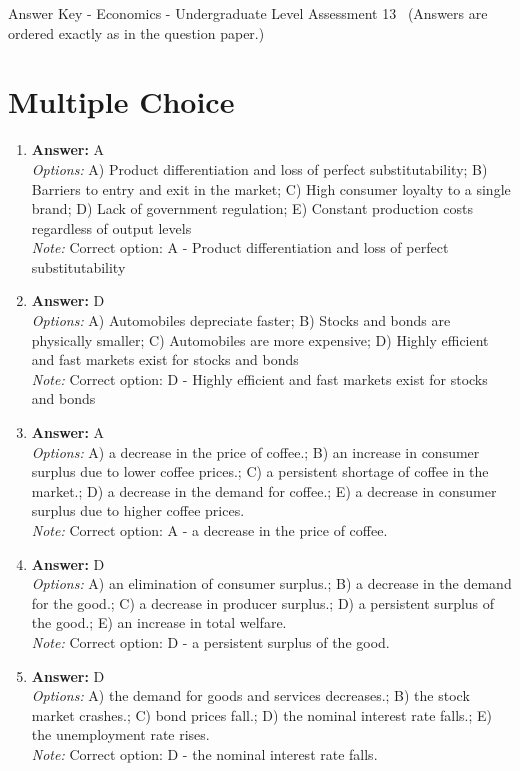 \documentclass[12pt]{article}
\begin{document}
\begin{center}
Answer Key - Economics - Undergraduate Level Assessment 13 \
\small (Answers are ordered exactly as in the question paper.)
\end{center}

\section*{Multiple Choice}
\begin{enumerate}[label=\arabic*.]
\item \textbf{Answer:} A
\\ \textit{Options:} A) Product differentiation and loss of perfect substitutability; B) Barriers to entry and exit in the market; C) High consumer loyalty to a single brand; D) Lack of government regulation; E) Constant production costs regardless of output levels
\\ \textit{Note:} Correct option: A - Product differentiation and loss of perfect substitutability
\item \textbf{Answer:} D
\\ \textit{Options:} A) Automobiles depreciate faster; B) Stocks and bonds are physically smaller; C) Automobiles are more expensive; D) Highly efficient and fast markets exist for stocks and bonds
\\ \textit{Note:} Correct option: D - Highly efficient and fast markets exist for stocks and bonds
\item \textbf{Answer:} A
\\ \textit{Options:} A) a decrease in the price of coffee.; B) an increase in consumer surplus due to lower coffee prices.; C) a persistent shortage of coffee in the market.; D) a decrease in the demand for coffee.; E) a decrease in consumer surplus due to higher coffee prices.
\\ \textit{Note:} Correct option: A - a decrease in the price of coffee.
\item \textbf{Answer:} D
\\ \textit{Options:} A) an elimination of consumer surplus.; B) a decrease in the demand for the good.; C) a decrease in producer surplus.; D) a persistent surplus of the good.; E) an increase in total welfare.
\\ \textit{Note:} Correct option: D - a persistent surplus of the good.
\item \textbf{Answer:} D
\\ \textit{Options:} A) the demand for goods and services decreases.; B) the stock market crashes.; C) bond prices fall.; D) the nominal interest rate falls.; E) the unemployment rate rises.
\\ \textit{Note:} Correct option: D - the nominal interest rate falls.
\end{enumerate}
\end{document}

